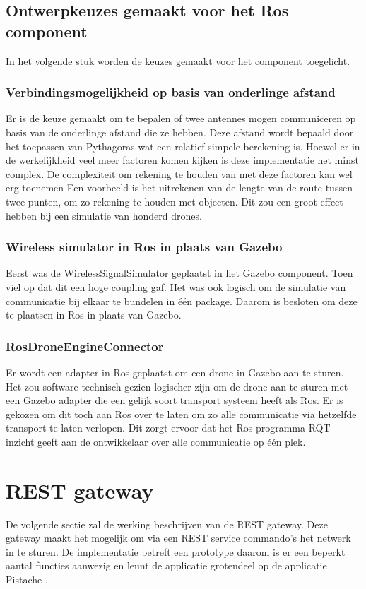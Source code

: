 \documentclass[a4paper, 11pt, oneside]{report}
\begin{document}
\subsection{Ontwerpkeuzes gemaakt voor het Ros component}
\label{DetailedDesign:ros:ontwerkeuzes}
In het volgende stuk worden de keuzes gemaakt voor het component toegelicht.

\subsubsection{Verbindingsmogelijkheid op basis van onderlinge afstand}
Er is de keuze gemaakt om te bepalen of twee antennes mogen communiceren op basis van de onderlinge afstand die ze hebben.
Deze afstand wordt bepaald door het toepassen van Pythagoras wat een relatief simpele berekening is. 
Hoewel er in de werkelijkheid veel meer factoren komen kijken is deze implementatie het minst complex.
De complexiteit om rekening te houden van met deze factoren kan wel erg toenemen
Een voorbeeld is het uitrekenen van de lengte van de route tussen twee punten, om zo rekening te houden met objecten.
Dit zou een groot effect hebben bij een simulatie van honderd drones.

\subsubsection{Wireless simulator in Ros in plaats van Gazebo}
Eerst was de WirelessSignalSimulator geplaatst in het Gazebo component. 
Toen viel op dat dit een hoge coupling gaf.
Het was ook logisch om de simulatie van communicatie bij elkaar te bundelen in één package.
Daarom is besloten om deze te plaatsen in Ros in plaats van Gazebo.

\subsubsection{RosDroneEngineConnector}
Er wordt een adapter in Ros geplaatst om een drone in Gazebo aan te sturen.
Het zou software technisch gezien logischer zijn om de drone aan te sturen met een Gazebo adapter die een gelijk soort transport systeem heeft als Ros.
Er is gekozen om dit toch aan Ros over te laten om zo alle communicatie via hetzelfde transport te laten verlopen.
Dit zorgt ervoor dat het Ros programma RQT inzicht geeft aan de ontwikkelaar over alle communicatie op één plek.


\section{REST gateway}
\label{DetailedDesign:RESTgateway}
De volgende sectie zal de werking beschrijven van de REST gateway. 
Deze gateway maakt het mogelijk om via een REST service commando's het netwerk in te sturen. 
De implementatie betreft een prototype daarom is er een beperkt aantal functies aanwezig en leunt de applicatie grotendeel op de applicatie Pistache \cite{pisrest}.
\end{document}
